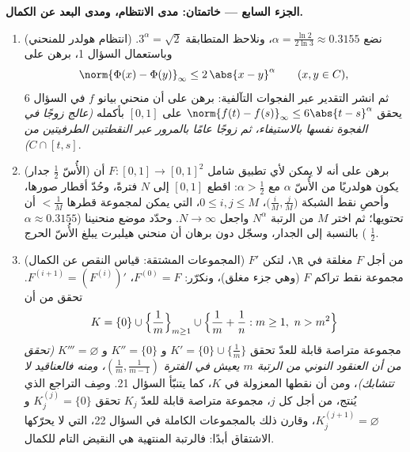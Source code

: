 \begin{problem}
\medskip
\noindent\textbf{الجزء السابع --- خاتمتان: مدى الانتظام، ومدى
البعد عن الكمال.}
\begin{enumerate}[resume]
  \item (انتظام هولدر للمنحني) نضع $\alpha =
        \frac{\ln 2}{2\ln 3} \approx 0.3155$، ونلاحظ المتطابقة
        $3^\alpha = \sqrt2$. وباستعمال السؤال 1، برهن على
        \[
        \norm{\Phi(x) - \Phi(y)}_\infty \leq 2\,\abs{x -
        y}^\alpha \qquad (x, y \in C),
        \]
        ثم انشر التقدير عبر الفجوات التآلفية: برهن على أن منحني
        بيانو $f$ في السؤال 6 يحقق $\norm{f(t) - f(s)}_\infty \leq 6\abs{t - s}^\alpha$ على $[0,1]$ بأكمله
        \emph{(عالج زوجًا في الفجوة نفسها بالاستيفاء، ثم زوجًا
        عامًا بالمرور عبر النقطتين الطرفيتين من
        $C \cap [t, s]$)}.
  \item (الأُسّ $\frac12$ جدار) برهن على أنه لا يمكن لأي تطبيق
        شامل $F \colon [0,1] \to [0,1]^2$ أن يكون هولدريًا من الأُسّ $\alpha$ مع
        $\alpha > \frac12$: اقطع $[0,1]$ إلى $N$ فترةً، وحُدّ أقطار صورها،
        وأحصِ نقط الشبكة $\bigl(\frac iM, \frac jM\bigr)$، $0 \leq i, j \leq M$، التي يمكن لمجموعة
        قطرها $< \frac1M$ أن تحتويها؛ ثم اختر $M$ من الرتبة
        $N^\alpha$ واجعل $N \to \infty$. وحدّد موضع منحنينا
        ($\alpha \approx 0.3155$) بالنسبة إلى الجدار، وسجّل دون برهان أن منحني
        هيلبرت يبلغ الأُسّ الحرج $\frac12$.
  \item (المجموعات المشتقة: قياس النقص عن الكمال) من أجل $F$
        مغلقة في $\R$، لتكن $F'$ مجموعة نقط تراكم $F$ (وهي جزء
        مغلق)، ونكرّر: $F^{(0)} = F$، $F^{(i+1)}
        = (F^{(i)})'$. تحقق من أن
        \[
        K = \{0\} \cup \Bigl\{\frac1m\Bigr\}_{m \geq 1} \cup
        \Bigl\{\frac1m + \frac1n : m \geq 1,\ n > m^2\Bigr\}
        \]
        مجموعة متراصة قابلة للعدّ تحقق $K' = \{0\} \cup
        \{\frac1m\}$ و $K'' = \{0\}$
        و $K''' = \varnothing$ \emph{(تحقق من أن العنقود النوني من الرتبة $m$
        يعيش في الفترة $(\frac1m, \frac1{m-1})$، ومنه فالعناقيد لا تتشابك)}، ومن
        أن نقطها المعزولة  في $K$، كما يتنبّأ السؤال 21.
        وصِف التراجع الذي يُنتج، من أجل كل $j$، مجموعة متراصة
        قابلة للعدّ $K_j$ تحقق $K_j^{(j)} = \{0\}$ و $K_j^{(j+1)} =
        \varnothing$، وقارن ذلك بالمجموعات
        الكاملة في السؤال 22، التي لا يحرّكها الاشتقاق أبدًا:
        فالرتبة المنتهية هي النقيض التام للكمال.
\end{enumerate}
\end{problem}
